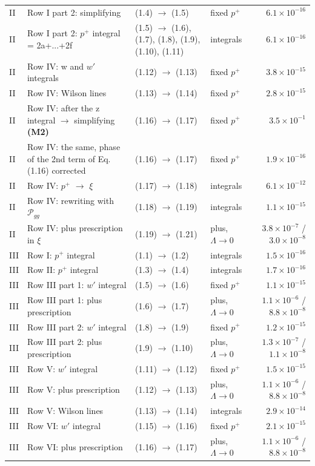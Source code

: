 \documentclass[10pt]{article}
\begin{document}
{\begin{longtable}{@{}l>{\raggedright\arraybackslash}p{5.6cm}>{\raggedright\arraybackslash}p{4.0cm}lr@{}}
II & Row I part 2: simplifying & (1.4) $\to$ (1.5) & fixed $p^+$ & $6.1\times10^{-16}$\\
II & Row I part 2: $p^+$ integral = 2a+...+2f & (1.5) $\to$ (1.6), (1.7), (1.8), (1.9), (1.10), (1.11) & integrals & $6.1\times10^{-16}$\\
II & Row IV: w and $w'$ integrals & (1.12) $\to$ (1.13) & fixed $p^+$ & $3.8\times10^{-15}$\\
II & Row IV: Wilson lines & (1.13) $\to$ (1.14) & fixed $p^+$ & $2.8\times10^{-15}$\\
II & Row IV: after the z integral $\to$ simplifying \textbf{(M2)} & (1.16) $\to$ (1.17) & fixed $p^+$ & $3.5\times10^{-1}$\\
II & Row IV: the same, phase of the 2nd term of Eq. (1.16) corrected & (1.16) $\to$ (1.17) & fixed $p^+$ & $1.9\times10^{-16}$\\
II & Row IV: $p^+$ $\to$ $\xi$ & (1.17) $\to$ (1.18) & integrals & $6.1\times10^{-12}$\\
II & Row IV: rewriting with $\mathcal P_{gg}$ & (1.18) $\to$ (1.19) & integrals & $1.1\times10^{-15}$\\
II & Row IV: plus prescription in $\xi$ & (1.19) $\to$ (1.21) & plus, $\Lambda\to0$ & $3.8\times10^{-7}$ / $3.0\times10^{-8}$\\
III & Row I: $p^+$ integral & (1.1) $\to$ (1.2) & integrals & $1.5\times10^{-16}$\\
III & Row II: $p^+$ integral & (1.3) $\to$ (1.4) & integrals & $1.7\times10^{-16}$\\
III & Row III part 1: $w'$ integral & (1.5) $\to$ (1.6) & fixed $p^+$ & $1.1\times10^{-15}$\\
III & Row III part 1: plus prescription & (1.6) $\to$ (1.7) & plus, $\Lambda\to0$ & $1.1\times10^{-6}$ / $8.8\times10^{-8}$\\
III & Row III part 2: $w'$ integral & (1.8) $\to$ (1.9) & fixed $p^+$ & $1.2\times10^{-15}$\\
III & Row III part 2: plus prescription & (1.9) $\to$ (1.10) & plus, $\Lambda\to0$ & $1.3\times10^{-7}$ / $1.1\times10^{-8}$\\
III & Row V: $w'$ integral & (1.11) $\to$ (1.12) & fixed $p^+$ & $1.5\times10^{-15}$\\
III & Row V: plus prescription & (1.12) $\to$ (1.13) & plus, $\Lambda\to0$ & $1.1\times10^{-6}$ / $8.8\times10^{-8}$\\
III & Row V: Wilson lines & (1.13) $\to$ (1.14) & integrals & $2.9\times10^{-14}$\\
III & Row VI: $w'$ integral & (1.15) $\to$ (1.16) & fixed $p^+$ & $2.1\times10^{-15}$\\
III & Row VI: plus prescription & (1.16) $\to$ (1.17) & plus, $\Lambda\to0$ & $1.1\times10^{-6}$ / $8.8\times10^{-8}$\\
\bottomrule
\end{longtable}}
\end{document}
